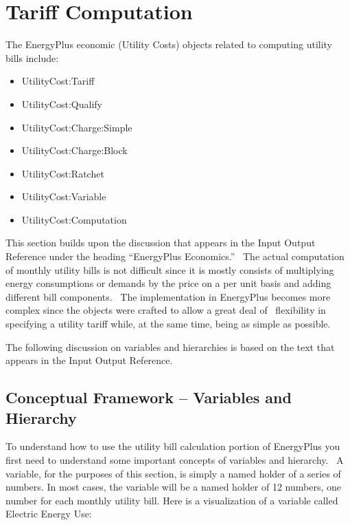 \section{Tariff Computation}\label{tariff-computation}

The EnergyPlus economic (Utility Costs) objects related to computing utility bills include:

\begin{itemize}
\item
  UtilityCost:Tariff
\item
  UtilityCost:Qualify
\item
  UtilityCost:Charge:Simple
\item
  UtilityCost:Charge:Block
\item
  UtilityCost:Ratchet
\item
  UtilityCost:Variable
\item
  UtilityCost:Computation
\end{itemize}

This section builds upon the discussion that appears in the Input Output Reference under the heading ``EnergyPlus Economics.''~ The actual computation of monthly utility bills is not difficult since it is mostly consists of multiplying energy consumptions or demands by the price on a per unit basis and adding different bill components.~ The implementation in EnergyPlus becomes more complex since the objects were crafted to allow a great deal of~ flexibility in specifying a utility tariff while, at the same time, being as simple as possible.

The following discussion on variables and hierarchies is based on the text that appears in the Input Output Reference.

\subsection{Conceptual Framework -- Variables and Hierarchy}\label{conceptual-framework-variables-and-hierarchy}

To understand how to use the utility bill calculation portion of EnergyPlus you first need to understand some important concepts of variables and hierarchy.~ A variable, for the purposes of this section, is simply a named holder of a series of numbers. In most cases, the variable will be a named holder of 12 numbers, one number for each monthly utility bill. Here is a visualization of a variable called Electric Energy Use:

